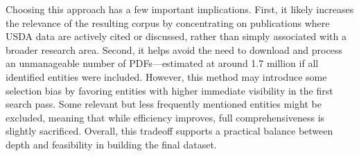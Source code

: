 \documentclass[
  letterpaper,
  DIV=11,
  numbers=noendperiod]{scrartcl}
\begin{document}
Choosing this approach has a few important implications. First, it
likely increases the relevance of the resulting corpus by concentrating
on publications where USDA data are actively cited or discussed, rather
than simply associated with a broader research area. Second, it helps
avoid the need to download and process an unmanageable number of
PDFs---estimated at around 1.7 million if all identified entities were
included. However, this method may introduce some selection bias by
favoring entities with higher immediate visibility in the first search
pass. Some relevant but less frequently mentioned entities might be
excluded, meaning that while efficiency improves, full comprehensiveness
is slightly sacrificed. Overall, this tradeoff supports a practical
balance between depth and feasibility in building the final dataset.
\end{document}
